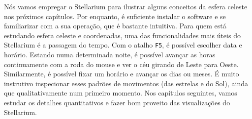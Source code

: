 Nós vamos empregar o Stellarium para ilustrar alguns conceitos da esfera celeste nos próximos capítulos. Por enquanto, é suficiente instalar o software e se familiarizar com a sua operação, que é bastante intuitiva. Para quem está estudando esfera celeste e coordenadas, uma das funcionalidades mais úteis do Stellarium é a passagem do tempo. Com o atalho \texttt{F5}, é possível escolher data e horário. Estando numa determinada noite, é possível avançar as horas continuamente com a roda do mouse e ver o céu girando de Leste para Oeste. Similarmente, é possível fixar um horário e avançar os dias ou meses. É muito instrutivo inspecionar esses padrões de movimentos (das estrelas e do Sol), ainda que qualitativamente num primeiro momento. Nos capítulos seguintes, vamos estudar os detalhes quantitativos e fazer bom proveito das visualizações do Stellarium.
